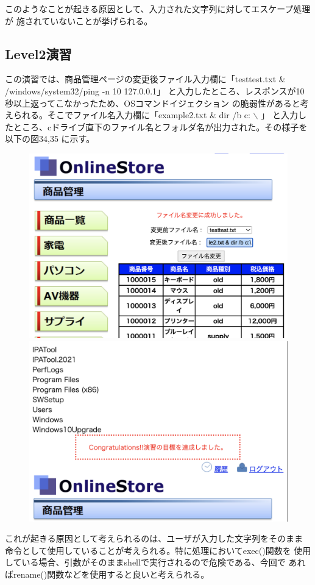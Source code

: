 \documentclass[dvipdfmx,autodetect-engine,titlepage]{jsarticle}
\begin{document}
このようなことが起きる原因として、入力された文字列に対してエスケープ処理が
施されていないことが挙げられる。

\subsection{Level2演習}
この演習では、商品管理ページの変更後ファイル入力欄に「testtest.txt \& /windows/system32/ping -n 10 127.0.0.1」
と入力したところ、レスポンスが10秒以上返ってこなかったため、OSコマンドイジェクション
の脆弱性があると考えられる。そこでファイル名入力欄に「example2.txt \& dir /b c: $\backslash$ 」
と入力したところ、cドライブ直下のファイル名とフォルダ名が出力された。その様子を以下の図34,35
に示す。

\begin{figure}[h]
  \centering
  \begin{minipage}[b]{0.45\linewidth}
  \begin{center}
    \includegraphics[keepaspectratio,scale=0.35]{pic33.png}
    \end{center}
    \caption{}
  \end{minipage}
  \begin{minipage}[b]{0.45\linewidth}
  \begin{center}
    \includegraphics[keepaspectratio,scale=0.4]{pic34.png}
    \end{center}
    \caption{}
  \end{minipage}
\end{figure}

これが起きる原因として考えられるのは、ユーザが入力した文字列をそのまま
命令として使用していることが考えられる。特に処理においてexec()関数を
使用している場合、引数がそのままshellで実行されるので危険である、今回で
あればrename()関数などを使用すると良いと考えられる。
\end{document}
